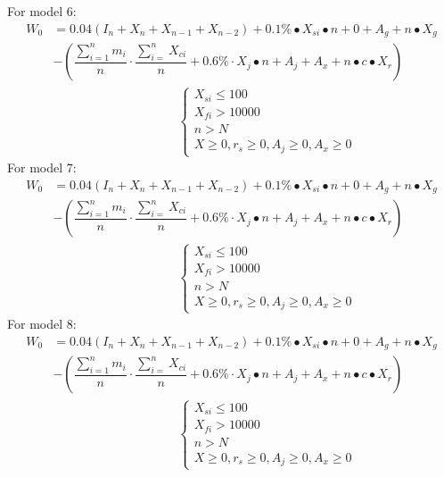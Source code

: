 \documentclass[../mcmpaper]{subfiles}
\begin{document}
For model 6:
\begin{equation}
\begin{aligned}
W_{0}&=0.04\left(I_{n}+X_{n}+X_{n-1}+X_{n-2}\right)+0.1 \% \bullet X_{s i} \bullet n+0+A_{g}+n \bullet X_{g} \\
&-\left(\dfrac{\sum_{i=1}^{n} m_{i}}{n} \cdot \dfrac{\sum_{i=}^{n} X_{c i}}{n}+0.6\% \cdot X_{j} \bullet n+A_{j}+A_{x}+n \bullet c \bullet X_{r}\right) \\
&\hspace{10em}\left\{\begin{array}{l}
X_{s i} \leq 100 \\
X_{f i}>10000 \\
n>N \\
X \geq 0, r_{s} \geq 0, A_{j} \geq 0, A_{x} \geq 0
\end{array}\right.
\end{aligned}
\end{equation}
For model 7:
\begin{equation}
\begin{aligned}
W_{0}&=0.04\left(I_{n}+X_{n}+X_{n-1}+X_{n-2}\right)+0.1 \% \bullet X_{s i} \bullet n+0+A_{g}+n \bullet X_{g} \\
&-\left(\dfrac{\sum_{i=1}^{n} m_{i}}{n} \cdot \dfrac{\sum_{i=}^{n} X_{c i}}{n}+0.6\% \cdot X_{j} \bullet n+A_{j}+A_{x}+n \bullet c \bullet X_{r}\right) \\
&\hspace{10em}\left\{\begin{array}{l}
X_{s i} \leq 100 \\
X_{f i}>10000 \\
n>N \\
X \geq 0, r_{s} \geq 0, A_{j} \geq 0, A_{x} \geq 0
\end{array}\right.
\end{aligned}
\end{equation}
For model 8:
\begin{equation}
\begin{aligned}
W_{0}&=0.04\left(I_{n}+X_{n}+X_{n-1}+X_{n-2}\right)+0.1 \% \bullet X_{s i} \bullet n+0+A_{g}+n \bullet X_{g} \\
&-\left(\dfrac{\sum_{i=1}^{n} m_{i}}{n} \cdot \dfrac{\sum_{i=}^{n} X_{c i}}{n}+0.6\% \cdot X_{j} \bullet n+A_{j}+A_{x}+n \bullet c \bullet X_{r}\right) \\
&\hspace{10em}\left\{\begin{array}{l}
X_{s i} \leq 100 \\
X_{f i}>10000 \\
n>N \\
X \geq 0, r_{s} \geq 0, A_{j} \geq 0, A_{x} \geq 0
\end{array}\right.
\end{aligned}
\end{equation}
\end{document}
